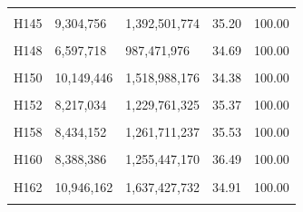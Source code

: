 \documentclass[
  a4paper,
  titlepage]{article}
\begin{document}
\begin{longtable}[t]{lllll}
\cellcolor{gray!6}{H144} & \cellcolor{gray!6}{7,823,204} & \cellcolor{gray!6}{1,170,837,736} & \cellcolor{gray!6}{34.66} & \cellcolor{gray!6}{100.00}\\
 
H145 & 9,304,756 & 1,392,501,774 & 35.20 & 100.00\\
 
\cellcolor{gray!6}{H146} & \cellcolor{gray!6}{7,287,908} & \cellcolor{gray!6}{1,090,754,965} & \cellcolor{gray!6}{34.90} & \cellcolor{gray!6}{100.00}\\
 
H148 & 6,597,718 & 987,471,976 & 34.69 & 100.00\\
 
\cellcolor{gray!6}{H149} & \cellcolor{gray!6}{8,070,276} & \cellcolor{gray!6}{1,207,703,281} & \cellcolor{gray!6}{34.52} & \cellcolor{gray!6}{100.00}\\
 
H150 & 10,149,446 & 1,518,988,176 & 34.38 & 100.00\\
 
\cellcolor{gray!6}{H151} & \cellcolor{gray!6}{10,394,830} & \cellcolor{gray!6}{1,555,973,805} & \cellcolor{gray!6}{34.66} & \cellcolor{gray!6}{100.00}\\
 
H152 & 8,217,034 & 1,229,761,325 & 35.37 & 100.00\\
 
\cellcolor{gray!6}{H157} & \cellcolor{gray!6}{9,943,834} & \cellcolor{gray!6}{1,487,756,340} & \cellcolor{gray!6}{35.05} & \cellcolor{gray!6}{100.00}\\
 
H158 & 8,434,152 & 1,261,711,237 & 35.53 & 100.00\\
 
\cellcolor{gray!6}{H159} & \cellcolor{gray!6}{9,087,786} & \cellcolor{gray!6}{1,360,073,789} & \cellcolor{gray!6}{35.27} & \cellcolor{gray!6}{100.00}\\
 
H160 & 8,388,386 & 1,255,447,170 & 36.49 & 100.00\\
 
\cellcolor{gray!6}{H161} & \cellcolor{gray!6}{10,160,868} & \cellcolor{gray!6}{1,520,849,267} & \cellcolor{gray!6}{35.05} & \cellcolor{gray!6}{100.00}\\
 
H162 & 10,946,162 & 1,637,427,732 & 34.91 & 100.00\\
 
\cellcolor{gray!6}{H164} & \cellcolor{gray!6}{11,542,740} & \cellcolor{gray!6}{1,727,637,403} & \cellcolor{gray!6}{34.84} & \cellcolor{gray!6}{100.00}\\
 

\end{longtable}
\end{document}
